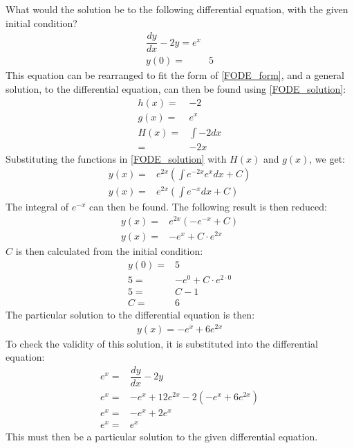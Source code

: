 \begin{tcolorbox}[colback=red!5!white,colframe=red!55!black,title=Example of solving a linear differential equation of first order] 

What would the solution be to the following differential equation, with the given initial condition?
\begin{align*}
	\dfrac{dy}{dx}-2y=e^x \\
	y(0) =& 5
\end{align*}
This equation can be rearranged to fit the form of \eqref{FODE_form}, and a general solution, to the differential equation, can then be found using \eqref{FODE_solution}:
\begin{align*}
	h(x) =& -2 \\
	g(x) =& e^x \\
	H(x) =& \int{-2 dx} \\
	     =& -2x
\end{align*}
Substituting the functions in \eqref{FODE_solution} with $H(x)$ and $g(x)$, we get: 
\begin{align*}
	y(x)=&e^{2x}(\int{e^{-2x}e^x dx}+C) \\
	y(x)=&e^{2x}(\int{e^{-x} dx}+C)
\end{align*}
The integral of $e^{-x}$ can then be found. The following result is then reduced:
\begin{align*}
	y(x)=&e^{2x}(-e^{-x}+C) \\
	y(x)=&-e^x+C \cdot e^{2x}
\end{align*}
$C$ is then calculated from the initial condition:
\begin{align*}
	y(0)=&5 \\
	5=&-e^0+C \cdot e^{2 \cdot 0} \\
	5 =& C-1 \\
	C =& 6
\end{align*}
The particular solution to the differential equation is then:
\begin{align*}
	y(x) = -e^x+6e^{2x}
\end{align*}
To check the validity of this solution, it is substituted into the differential equation:
\begin{align*}
	e^x =& \dfrac{dy}{dx} -2y \\
	e^x =& -e^x+12e^{2x} -2(-e^x+6e^{2x})  \\
	e^x =& -e^x+2e^x  \\
	e^x =& e^x
\end{align*}
This must then be a particular solution to the given differential equation.
\end{tcolorbox}

